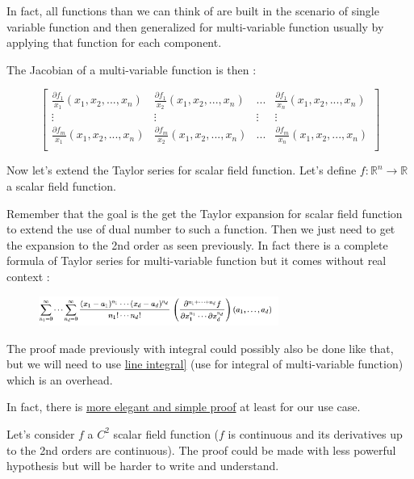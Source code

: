 \documentclass[12pt]{article}
\begin{document}
In fact, all functions than we can think of are built in the scenario of single variable function and then generalized for multi-variable function usually by applying that function for each component. 

The Jacobian of a multi-variable function is then :

$$
\begin{bmatrix}
    \frac{\partial{f_1}}{x_1}(x_1, x_2, ..., x_n) & \frac{\partial{f_1}}{x_2}(x_1, x_2, ..., x_n)  & ... & \frac{\partial{f_1}}{x_n}(x_1, x_2, ..., x_n) \\

    \vdots & \vdots & \vdots & \vdots \\

    \frac{\partial{f_m}}{x_1}(x_1, x_2, ..., x_n) & \frac{\partial{f_m}}{x_2}(x_1, x_2, ..., x_n)  & ...  &\frac{\partial{f_m}}{x_n}(x_1, x_2, ..., x_n) \\
\end{bmatrix}
$$

Now let's extend the Taylor series for scalar field function. Let's define $f : \mathbb{R}^n \rightarrow \mathbb{R}$ a scalar field function.

Remember that the goal is the get the Taylor expansion for scalar field function to extend the use of dual number to such a function. Then we just need to get the expansion to the 2nd order as seen previously. In fact there is a complete formula of Taylor series for multi-variable function but it comes without real context :


\begin{figure}[H]
\centering
\includegraphics[width=0.7\textwidth]{assets/images/Dx93rZHiBg.png}
\end{figure}


The proof made previously with integral could possibly also be done like that, but we will need to use \href{ttps://en.wikipedia.org/wiki/Line_integral}{line integral]} (use for integral of multi-variable function) which is an overhead.

In fact, there is \href{https://math.stackexchange.com/questions/221669/derivation-of-multivariable-taylor-series}{more elegant and simple proof} at least for our use case.

Let's consider $f$ a $C^2$ scalar field function ($f$ is continuous and its derivatives up to the 2nd orders are continuous). The proof could be made with less powerful hypothesis but will be harder to write and understand.
\end{document}
